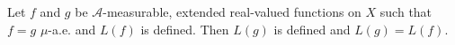 Let $f$ and $g$ be $\mathcal{A}$-measurable, extended real-valued functions on $X$ such that $f = g$ $\mu$-a.e. and $L(f)$ is defined. Then $L(g)$ is defined and $L(g) = L(f)$.
